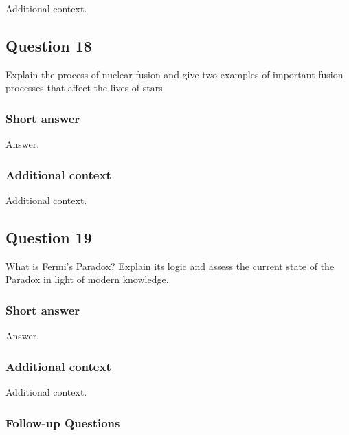 \documentclass[a4paper,10pt]{article}
\begin{document}
Additional context.


\newpage
\subsection{Question 18}

Explain the process of nuclear fusion and give two examples of important fusion processes that affect the lives of stars.

\subsubsection{Short answer}

Answer.

\subsubsection{Additional context}

Additional context.


\newpage
\subsection{Question 19}

What is Fermi's Paradox? Explain its logic and assess the current state of the Paradox in light of modern knowledge.

\subsubsection{Short answer}

Answer.

\subsubsection{Additional context}

Additional context.

\subsubsection{Follow-up Questions}
\end{document}
